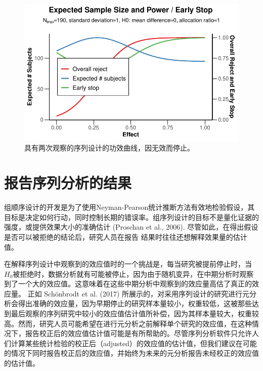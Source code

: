 \documentclass[
  letterpaper,
  DIV=11,
  numbers=noendperiod]{scrreprt}
\begin{document}
\begin{figure}

{\centering \includegraphics[width=1\textwidth,height=\textheight]{10-sequential_files/figure-pdf/fig-powerseq2-1.pdf}

}

\caption{\label{fig-powerseq2}具有两次观察的序列设计的功效曲线，因无效而停止。}

\end{figure}

\hypertarget{ux62a5ux544aux5e8fux5217ux5206ux6790ux7684ux7ed3ux679c}{%
\section{报告序列分析的结果}\label{ux62a5ux544aux5e8fux5217ux5206ux6790ux7684ux7ed3ux679c}}

组顺序设计的开发是为了使用Neyman-Pearson统计推断方法有效地检验假设，其目标是决定如何行动，同时控制长期的错误率。组序列设计的目标不是量化证据的强度，或提供效果大小的准确估计
(Proschan et al., 2006).
尽管如此，在得出假设是否可以被拒绝的结论后，研究人员在报告
结果时往往还想解释效果量的估计值。

在解释序列设计中观察到的效应值时的一个挑战是，每当研究被提前停止时，当\(H_0\)被拒绝时，数据分析就有可能被停止，因为由于随机变异，在中期分析时观察到了一个大的效应值。这意味着在这些中期分析中观察到的效应量高估了真正的效应量。
正如 Schönbrodt et al. (2017)
所展示的，对采用序列设计的研究进行元分析会得出准确的效应量，因为早期停止的研究样本量较小，权重较低，这被那些达到最后观察的序列研究中较小的效应值估计值所补偿，因为其样本量较大，权重较高。然而，研究人员可能希望在进行元分析之前解释单个研究的效应值，在这种情况下，报告校正后的效应值估计值可能是有所帮助的。尽管序列分析软件只允许人们计算某些统计检验的校正后（adjusted）的效应值的估计值，但我们建议在可能的情况下同时报告校正后的效应值，并始终为未来的元分析报告未经校正的效应值的估计值。
\end{document}
